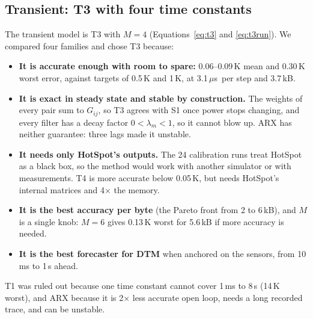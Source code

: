 \documentclass[11pt,a4paper]{article}
\newcommand{\us}{\,$\mu$s}
\begin{document}
\subsection{Transient: T3 with four time constants}
The transient model is T3 with $M=4$ (Equations~\eqref{eq:t3} and \eqref{eq:t3run}). We compared
four families and chose T3 because:
\begin{itemize}
  \item \textbf{It is accurate enough with room to spare:} 0.06--0.09\,K mean and 0.30\,K worst
        error, against targets of 0.5\,K and 1\,K, at 3.1\us\ per step and 3.7\,kB.
  \item \textbf{It is exact in steady state and stable by construction.} The weights of every pair
        sum to $G_{ij}$, so T3 agrees with S1 once power stops changing, and every filter has a
        decay factor $0 < \lambda_m < 1$, so it cannot blow up. ARX has neither guarantee: three
        lags made it unstable.
  \item \textbf{It needs only HotSpot's outputs.} The 24 calibration runs treat HotSpot as a black
        box, so the method would work with another simulator or with measurements. T4 is more
        accurate below 0.05\,K, but needs HotSpot's internal matrices and 4$\times$ the memory.
  \item \textbf{It is the best accuracy per byte} (the Pareto front from 2 to 6\,kB), and
        $M$ is a single knob: $M=6$ gives 0.13\,K worst for 5.6\,kB if more accuracy is needed.
  \item \textbf{It is the best forecaster for DTM} when anchored on the sensors, from 10\,ms to 1\,s
        ahead.
\end{itemize}
T1 was ruled out because one time constant cannot cover 1\,ms to 8\,s (14\,K worst), and ARX
because it is 2$\times$ less accurate open loop, needs a long recorded trace, and can be unstable.
\end{document}
